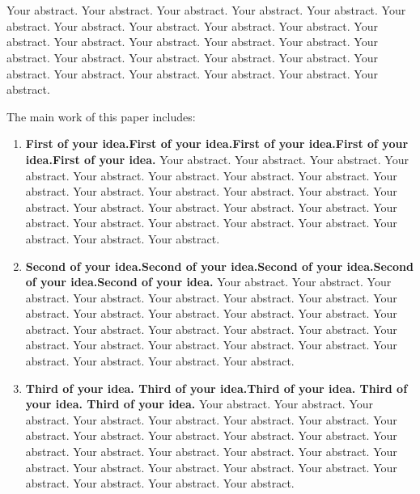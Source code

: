 \newpage
\vspace{-1cm}
\chapter*{}
Your abstract. Your abstract. Your abstract. Your abstract. Your abstract. Your abstract. Your abstract. Your abstract. Your abstract. Your abstract. Your abstract. Your abstract. Your abstract. Your abstract. Your abstract. Your abstract. Your abstract. Your abstract. Your abstract. Your abstract. Your abstract. Your abstract. Your abstract. Your abstract. Your abstract. Your abstract.

The main work of this paper includes:
\begin{enumerate}
\item 
\textbf{First of your idea.First of your idea.First of your idea.First of your idea.First of your idea.}
Your abstract. Your abstract. Your abstract. Your abstract. Your abstract. Your abstract. Your abstract. Your abstract. Your abstract. Your abstract. Your abstract. Your abstract. Your abstract. Your abstract. Your abstract. Your abstract. Your abstract. Your abstract. Your abstract. Your abstract. Your abstract. Your abstract. Your abstract. Your abstract. Your abstract. Your abstract.
	
\item
\textbf{Second of your idea.Second of your idea.Second of your idea.Second of your idea.Second of your idea.} Your abstract. Your abstract. Your abstract. Your abstract. Your abstract. Your abstract. Your abstract. Your abstract. Your abstract. Your abstract. Your abstract. Your abstract. Your abstract. Your abstract. Your abstract. Your abstract. Your abstract. Your abstract. Your abstract. Your abstract. Your abstract. Your abstract. Your abstract. Your abstract. Your abstract. Your abstract.

\item
\textbf{Third of your idea. Third of your idea.Third of your idea. Third of your idea. Third of your idea.} Your abstract. Your abstract. Your abstract. Your abstract. Your abstract. Your abstract. Your abstract. Your abstract. Your abstract. Your abstract. Your abstract. Your abstract. Your abstract. Your abstract. Your abstract. Your abstract. Your abstract. Your abstract. Your abstract. Your abstract. Your abstract. Your abstract. Your abstract. Your abstract. Your abstract. Your abstract.
\end{enumerate}

